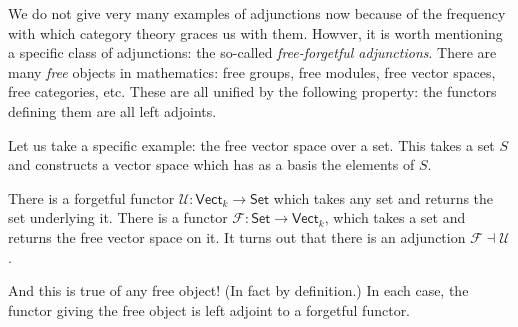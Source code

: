 \documentclass[notes.tex]{subfiles}
\begin{document}
\begin{note}
  We do not give very many examples of adjunctions now because of the frequency with which category theory graces us with them. Howver, it is worth mentioning a specific class of adjunctions: the so-called \emph{free-forgetful adjunctions}. There are many \emph{free} objects in mathematics: free groups, free modules, free vector spaces, free categories, etc. These are all unified by the following property: the functors defining them are all left adjoints.

  Let us take a specific example: the free vector space over a set. This takes a set $S$ and constructs a vector space which has as a basis the elements of $S$.

  There is a forgetful functor $\mathcal{U}\colon \mathsf{Vect}_{k} \rightarrow \mathsf{Set}$ which takes any set and returns the set underlying it. There is a functor $\mathcal{F}\colon \mathsf{Set} \rightarrow \mathsf{Vect}_{k}$, which takes a set and returns the free vector space on it. It turns out that there is an adjunction $\mathcal{F} \dashv \mathcal{U}$.

  And this is true of any free object! (In fact by definition.) In each case, the functor giving the free object is left adjoint to a forgetful functor.
\end{note}
\end{document}
